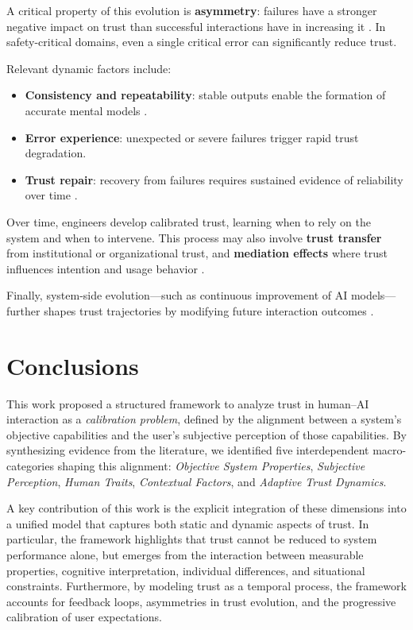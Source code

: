 \documentclass[sigconf]{acmart}
\begin{document}
A critical property of this evolution is \textbf{asymmetry}: failures have a stronger negative impact on trust than successful interactions have in increasing it \cite{kaplan2021trust}. In safety-critical domains, even a single critical error can significantly reduce trust.

Relevant dynamic factors include:

\begin{itemize}[leftmargin=*, label=\textbullet]
    \item \textbf{Consistency and repeatability}: stable outputs enable the formation of accurate mental models \cite{yang_wibowo_2022}.
    
    \item \textbf{Error experience}: unexpected or severe failures trigger rapid trust degradation.
    
    \item \textbf{Trust repair}: recovery from failures requires sustained evidence of reliability over time \cite{de_visser_longitudinal_trust}.
\end{itemize}

Over time, engineers develop calibrated trust, learning when to rely on the system and when to intervene. This process may also involve \textbf{trust transfer} from institutional or organizational trust, and \textbf{mediation effects} where trust influences intention and usage behavior \cite{schepman_general_attitude, choudhury_chat_gpt}.

Finally, system-side evolution—such as continuous improvement of AI models—further shapes trust trajectories by modifying future interaction outcomes \cite{wang2019artificial}.


\section{Conclusions}

This work proposed a structured framework to analyze trust in human--AI interaction as a \emph{calibration problem}, defined by the alignment between a system’s objective capabilities and the user’s subjective perception of those capabilities. By synthesizing evidence from the literature, we identified five interdependent macro-categories shaping this alignment: \emph{Objective System Properties}, \emph{Subjective Perception}, \emph{Human Traits}, \emph{Contextual Factors}, and \emph{Adaptive Trust Dynamics}.

A key contribution of this work is the explicit integration of these dimensions into a unified model that captures both static and dynamic aspects of trust. In particular, the framework highlights that trust cannot be reduced to system performance alone, but emerges from the interaction between measurable properties, cognitive interpretation, individual differences, and situational constraints. Furthermore, by modeling trust as a temporal process, the framework accounts for feedback loops, asymmetries in trust evolution, and the progressive calibration of user expectations.
\end{document}
